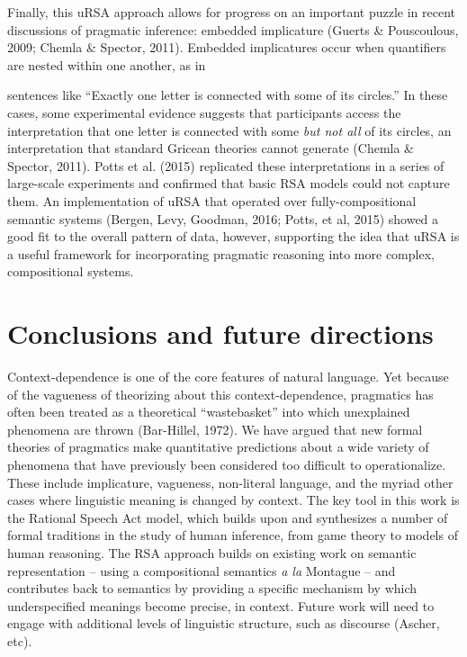 \documentclass[]{elsarticle}
\begin{document}
Finally, this uRSA approach allows for progress on an important puzzle
in recent discussions of pragmatic inference: embedded implicature
(Guerts \& Pouscoulous, 2009; Chemla \& Spector, 2011). Embedded
implicatures occur when quantifiers are nested within one another, as in

sentences like ``Exactly one letter is connected with some of its
circles.'' In these cases, some experimental evidence suggests that
participants access the interpretation that one letter is connected with
some \emph{but not all} of its circles, an interpretation that standard
Gricean theories cannot generate (Chemla \& Spector, 2011). Potts et al.
(2015) replicated these interpretations in a series of large-scale
experiments and confirmed that basic RSA models could not capture them.
An implementation of uRSA that operated over fully-compositional
semantic systems (Bergen, Levy, Goodman, 2016; Potts, et al, 2015)
showed a good fit to the overall pattern of data, however, supporting
the idea that uRSA is a useful framework for incorporating pragmatic
reasoning into more complex, compositional systems.

\section{Conclusions and future directions}\label{conclusions-and-future-directions}

Context-dependence is one of the core features of natural language. Yet
because of the vagueness of theorizing about this context-dependence,
pragmatics has often been treated as a theoretical ``wastebasket'' into
which unexplained phenomena are thrown (Bar-Hillel, 1972). We have
argued that new formal theories of pragmatics make quantitative
predictions about a wide variety of phenomena that have previously been
considered too difficult to operationalize. These include implicature,
vagueness, non-literal language, and the myriad other cases where
linguistic meaning is changed by context. The key tool in this work is
the Rational Speech Act model, which builds upon and synthesizes a
number of formal traditions in the study of human inference, from game
theory to models of human reasoning. The RSA approach builds on existing
work on semantic representation -- using a compositional semantics
\emph{a la} Montague -- and contributes back to semantics by providing a
specific mechanism by which underspecified meanings become precise, in
context. Future work will need to engage with additional levels of
linguistic structure, such as discourse (Ascher, etc).
\end{document}
